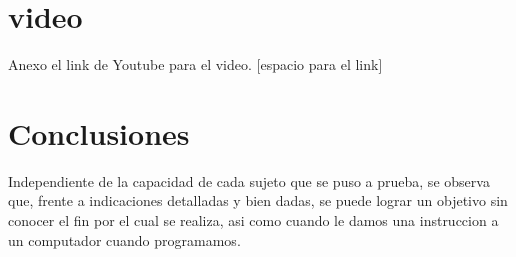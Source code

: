 \documentclass{article}
\begin{document}
 \section{video} \label{video }
Anexo el link de Youtube para el video.
[espacio para el link]
\section {Conclusiones} \label{conclusion} 
Independiente de la capacidad de cada sujeto que se puso a prueba, se observa que, frente a indicaciones detalladas y bien dadas, se puede lograr un objetivo sin conocer el fin por el cual se realiza, asi como cuando le damos una instruccion a un computador cuando programamos.
\end{document}
